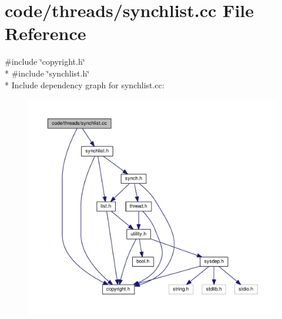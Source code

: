 \section{code/threads/synchlist.cc File Reference}
\label{synchlist_8cc}
{\ttfamily \#include \char`\"{}copyright.\+h\char`\"{}}\\*
{\ttfamily \#include \char`\"{}synchlist.\+h\char`\"{}}\\*
Include dependency graph for synchlist.\+cc\+:
\nopagebreak
\begin{figure}[H]
\begin{center}
\leavevmode
\includegraphics[width=350pt]{synchlist_8cc__incl}
\end{center}
\end{figure}
